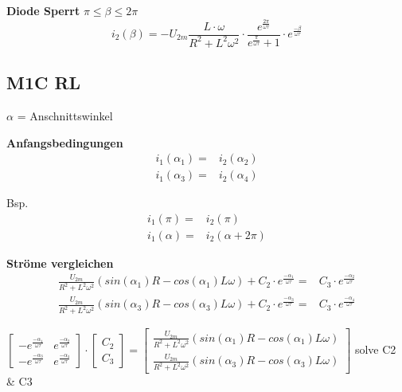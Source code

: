 \textbf{Diode Sperrt} $ \pi \leq \beta \leq 2\pi $\newline
\[ i_2(\beta) = -U_{2m} \frac{L \cdot \omega}{R^2 + L^2\omega^2} \cdot  \frac{e^{\frac{2\pi}{\omega \tau}}}{e^{\frac{\pi}{\omega \tau}} +1} \cdot e^{\frac{-\beta}{\omega \tau}} \]
\clearpage

\subsection{M1C RL}
$ \alpha $ = Anschnittswinkel \newline
\begin{minipage}{8cm}
    \textbf{Anfangsbedingungen}
    \begin{align*}
        i_1(\alpha_1) = & i_2(\alpha_2)\\
        i_1(\alpha_3)  = & i_2(\alpha_4)
    \end{align*}
\end{minipage}
\begin{minipage}{8cm}
    Bsp.
    \begin{align*}
    i_1(\pi) = & i_2(\pi)\\
    i_1(\alpha)  = & i_2(\alpha + 2\pi)
    \end{align*}
\end{minipage}

\textbf{Ströme vergleichen}
\begin{align*}
 \frac{U_{2m}}{R^2 + L^2\omega^2}\left(sin(\alpha_1) R - cos(\alpha_1) L\omega\right) + C_2 \cdot e^{\frac{-\alpha_1}{\omega \tau}} = & C_3 \cdot e^{\frac{-\alpha_2}{\omega \tau}}\\
 \frac{U_{2m}}{R^2 + L^2\omega^2}\left(sin(\alpha_3) R - cos(\alpha_3) L\omega\right) + C_2 \cdot e^{\frac{-\alpha_3}{\omega \tau}} = & C_3 \cdot e^{\frac{-\alpha_4}{\omega \tau}} 
\end{align*}

\begin{minipage}{\linewidth}
    $
    \begin{bmatrix}
        -e^{\frac{-\alpha_1}{\omega \tau}}       &e^{\frac{-\alpha_2}{\omega \tau}} \\
        -e^{\frac{-\alpha_3}{\omega \tau}}       &e^{\frac{-\alpha_4}{\omega \tau}}
    \end{bmatrix} 
    \cdot
    \begin{bmatrix}
        C_2\\
        C_3
    \end{bmatrix} 
    =
    \begin{bmatrix}
        \frac{U_{2m}}{R^2 + L^2\omega^2}\left(sin(\alpha_1) R - cos(\alpha_1) L\omega\right)\\
        \frac{U_{2m}}{R^2 + L^2\omega^2}\left(sin(\alpha_3) R - cos(\alpha_3) L\omega\right)
    \end{bmatrix} 
    $ \newline
    solve C2 \& C3 \\
\end{minipage}


